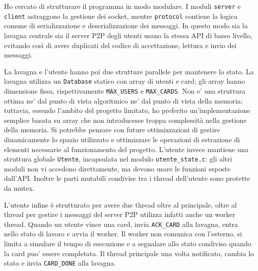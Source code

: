 \documentclass[10pt,a4paper]{article}
\makeatletter
\renewcommand\section{\@startsection{section}{1}{0pt}{1em}{1em}{\normalfont\large\bfseries}}
\makeatother
\begin{document}
\section{Struttura logica del programma}

Ho cercato di strutturare il programma in modo modulare. I moduli \texttt{server} e \texttt{client} astraggono la gestione dei socket, mentre \texttt{protocol} contiene la logica comune di serializzazione e deserializzazione dei messaggi. In questo modo sia la lavagna centrale sia il server P2P degli utenti usano la stessa API di basso livello, evitando così di avere duplicati del codice di accettazione, lettura e invio dei messaggi.

La lavagna e l'utente hanno poi due strutture parallele per mantenere lo stato. La lavagna utilizza un \texttt{Database} statico con array di utenti e card; gli array hanno dimensione fissa, rispettivamente \texttt{MAX\_USERS} e \texttt{MAX\_CARDS}. Non e' una struttura ottima ne' dal punto di vista algoritmico ne' dal punto di vista della memoria; tuttavia, essendo l'ambito del progetto limitato, ho preferito un'implementazione semplice basata su array che non introducesse troppa complessità nella gestione della memoria. Si potrebbe pensare con future ottimizzazioni di gestire dinamicamente lo spazio utilizzato e ottimizzare le operazioni di estrazione di elementi necessarie al funzionamento del progetto. L'utente invece mantiene una struttura globale \texttt{Utente}, incapsulata nel modulo \texttt{utente\_state.c}: gli altri moduli non vi accedono direttamente, ma devono usare le funzioni esposte dall'API. Inoltre le parti mutabili condivise tra i thread dell'utente sono protette da mutex.

L'utente infine è strutturato per avere due thread oltre al principale, oltre al thread per gestire i messaggi del server P2P utilizza infatti anche un worker thread. Quando un utente vince una card, invia \texttt{ACK\_CARD} alla lavagna, entra nello stato di lavoro e avvia il worker. Il worker non comunica con l'esterno, si limita a simulare il tempo di esecuzione e a segnalare allo stato condiviso quando la card puo' essere completata. Il thread principale una volta notificato, cambia lo stato e invia \texttt{CARD\_DONE} alla lavagna.
\end{document}
